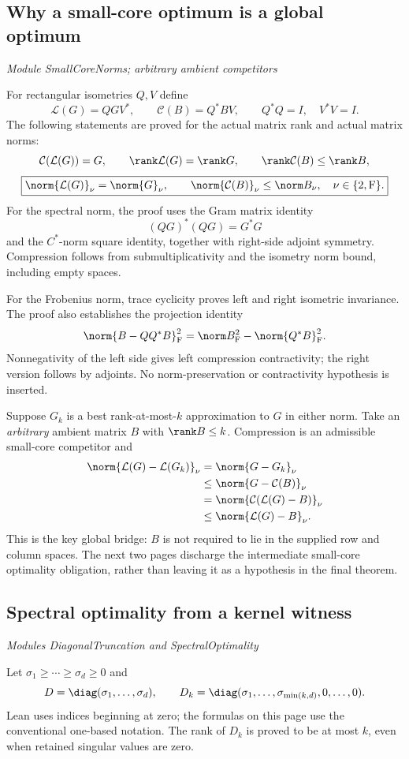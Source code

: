 \subsection{Why a small-core optimum is a global optimum}\label{supp6:subsection:002}\textit{Module SmallCoreNorms; arbitrary ambient competitors}\par
For rectangular isometries $Q,V$ define
\[
\mathcal L(G)=QGV^*,\qquad \mathcal C(B)=Q^*BV,
\qquad Q^*Q=I,\quad V^*V=I.
\]
The following statements are proved for the actual matrix rank and actual matrix norms:
\[
\mathcal C(\mathcal L(G))=G,
\qquad \rank\mathcal L(G)=\rank G,
\qquad \rank\mathcal C(B)\leq\rank B,
\]
\[
\boxed{\norm{\mathcal L(G)}_\nu=\norm{G}_\nu,
\qquad \norm{\mathcal C(B)}_\nu\leq\norm B_\nu,
\quad \nu\in\{2,\mathrm F\}.}
\]
For the spectral norm, the proof uses the Gram matrix identity
\[
(QG)^*(QG)=G^*G
\]
and the $C^*$-norm square identity, together with right-side adjoint symmetry. Compression follows from submultiplicativity and the isometry norm bound, including empty spaces.

For the Frobenius norm, trace cyclicity proves left and right isometric invariance. The proof also establishes the projection identity
\[
\norm{B-QQ^*B}_{\mathrm F}^{2}
=\norm B_{\mathrm F}^{2}-\norm{Q^*B}_{\mathrm F}^{2}.
\]
Nonnegativity of the left side gives left compression contractivity; the right version follows by adjoints. No norm-preservation or contractivity hypothesis is inserted.

Suppose $G_k$ is a best rank-at-most-$k$ approximation to $G$ in either norm. Take an \emph{arbitrary} ambient matrix $B$ with $\rank B\leq k$. Compression is an admissible small-core competitor and
\[
\begin{aligned}
\norm{\mathcal L(G)-\mathcal L(G_k)}_\nu
&=\norm{G-G_k}_\nu\\
&\leq\norm{G-\mathcal C(B)}_\nu\\
&=\norm{\mathcal C(\mathcal L(G)-B)}_\nu\\
&\leq\norm{\mathcal L(G)-B}_\nu.
\end{aligned}
\]
This is the key global bridge: $B$ is not required to lie in the supplied row and column spaces. The next two pages discharge the intermediate small-core optimality obligation, rather than leaving it as a hypothesis in the final theorem.



\subsection{Spectral optimality from a kernel witness}\label{supp6:subsection:003}\textit{Modules DiagonalTruncation and SpectralOptimality}\par
Let $\sigma_1\geq\cdots\geq\sigma_d\geq0$ and
\[
D=\diag(\sigma_1,\ldots,\sigma_d),\qquad
D_k=\diag(\sigma_1,\ldots,\sigma_{\min(k,d)},0,\ldots,0).
\]
Lean uses indices beginning at zero; the formulas on this page use the conventional one-based notation. The rank of $D_k$ is proved to be at most $k$, even when retained singular values are zero.

